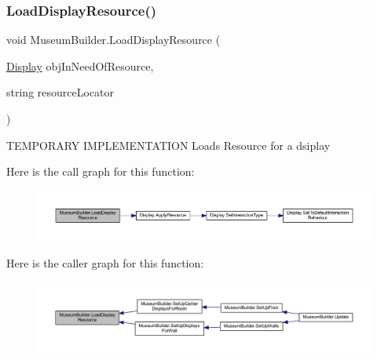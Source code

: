 \subsubsection{\texorpdfstring{Load\+Display\+Resource()}{LoadDisplayResource()}}
{\footnotesize\ttfamily void Museum\+Builder.\+Load\+Display\+Resource (\begin{DoxyParamCaption}\item[{\mbox{\hyperlink{class_display}{Display}}}]{obj\+In\+Need\+Of\+Resource,  }\item[{string}]{resource\+Locator }\end{DoxyParamCaption})\hspace{0.3cm}{\ttfamily [private]}}



T\+E\+M\+P\+O\+R\+A\+RY I\+M\+P\+L\+E\+M\+E\+N\+T\+A\+T\+I\+ON Loads Resource for a dsiplay 

Here is the call graph for this function\+:
\nopagebreak
\begin{figure}[H]
\begin{center}
\leavevmode
\includegraphics[width=350pt]{class_museum_builder_a895b10deac965d8d7b936dd76d82484d_cgraph}
\end{center}
\end{figure}
Here is the caller graph for this function\+:
\nopagebreak
\begin{figure}[H]
\begin{center}
\leavevmode
\includegraphics[width=350pt]{class_museum_builder_a895b10deac965d8d7b936dd76d82484d_icgraph}
\end{center}
\end{figure}
\mbox{\label{class_museum_builder_a159e037415aaf348d5a0af9561be8560}} 
